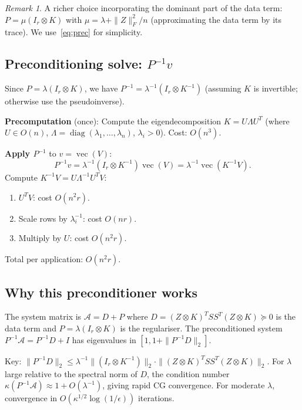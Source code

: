 \documentclass[12pt]{article}
\theoremstyle{definition}
\theoremstyle{remark}
\newtheorem{remark}[theorem]{Remark}
\DeclareMathOperator{\vecop}{vec}
\DeclareMathOperator{\diag}{diag}
\begin{document}
\begin{remark}
A richer choice incorporating the dominant part of the data term:
$P = \mu(I_r\otimes K)$ with $\mu = \lambda + \|Z\|_F^2/n$ (approximating
the data term by its trace).  We use~\eqref{eq:prec} for simplicity.
\end{remark}

\subsection{Preconditioning solve: $P^{-1}v$}

Since $P = \lambda(I_r\otimes K)$, we have
$P^{-1} = \lambda^{-1}(I_r\otimes K^{-1})$
(assuming $K$ is invertible; otherwise use the pseudoinverse).

\textbf{Precomputation} (once): Compute the eigendecomposition $K = U\Lambda U^T$
(where $U\in O(n)$, $\Lambda = \diag(\lambda_1,\dots,\lambda_n)$, $\lambda_i>0$).
Cost: $O(n^3)$.

\textbf{Apply $P^{-1}$} to $v = \vecop(V)$:
\[
  P^{-1}v = \lambda^{-1}(I_r\otimes K^{-1})\vecop(V)
  = \lambda^{-1}\vecop(K^{-1}V).
\]
Compute $K^{-1}V = U\Lambda^{-1}U^T V$:
\begin{enumerate}
\item $U^TV$: cost $O(n^2r)$.
\item Scale rows by $\lambda_i^{-1}$: cost $O(nr)$.
\item Multiply by $U$: cost $O(n^2r)$.
\end{enumerate}
Total per application: $O(n^2r)$.

\subsection{Why this preconditioner works}

The system matrix is $\mathcal{A} = D + P$ where
$D = (Z\otimes K)^T SS^T(Z\otimes K) \succeq 0$ is the data term and
$P = \lambda(I_r\otimes K)$ is the regulariser.
The preconditioned system $P^{-1}\mathcal{A} = P^{-1}D + I$ has eigenvalues
in $[1, 1 + \|P^{-1}D\|_2]$.

Key: $\|P^{-1}D\|_2 \leq \lambda^{-1}\|(I_r\otimes K^{-1})\|_2
\cdot\|(Z\otimes K)^T SS^T(Z\otimes K)\|_2$.
For $\lambda$ large relative to the spectral norm of $D$, the condition
number $\kappa(P^{-1}\mathcal{A}) \approx 1 + O(\lambda^{-1})$, giving
rapid CG convergence.  For moderate $\lambda$, convergence in
$O(\kappa^{1/2}\log(1/\epsilon))$ iterations.

\end{document}
